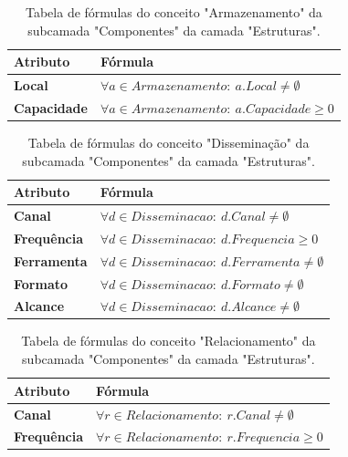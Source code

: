 \begin{apendicesenv}
\begin{table}[H]
\centering
\caption{Tabela de fórmulas do conceito "Armazenamento" da subcamada "Componentes" da camada "Estruturas".}
\begin{tabularx}{\textwidth}{|l|X|}
\hline
\textbf{Atributo} & \textbf{Fórmula} \\ \hline
\textbf{Local} & $\forall a \in Armazenamento:\ a.Local \neq \emptyset$ \\ \hline
\textbf{Capacidade} & $\forall a \in Armazenamento:\ a.Capacidade \ge 0$ \\ \hline
\end{tabularx}
\end{table}

\begin{table}[H]
\centering
\caption{Tabela de fórmulas do conceito "Disseminação" da subcamada "Componentes" da camada "Estruturas".}
\begin{tabularx}{\textwidth}{|l|X|}
\hline
\textbf{Atributo} & \textbf{Fórmula} \\ \hline
\textbf{Canal} & $\forall d \in Disseminacao:\ d.Canal \neq \emptyset$ \\ \hline
\textbf{Frequência} & $\forall d \in Disseminacao:\ d.Frequencia \ge 0$ \\ \hline
\textbf{Ferramenta} & $\forall d \in Disseminacao:\ d.Ferramenta \neq \emptyset$ \\ \hline
\textbf{Formato} & $\forall d \in Disseminacao:\ d.Formato \neq \emptyset$ \\ \hline
\textbf{Alcance} & $\forall d \in Disseminacao:\ d.Alcance \neq \emptyset$ \\ \hline
\end{tabularx}
\end{table}

\begin{table}[H]
\centering
\caption{Tabela de fórmulas do conceito "Relacionamento" da subcamada "Componentes" da camada "Estruturas".}
\begin{tabularx}{\textwidth}{|l|X|}
\hline
\textbf{Atributo} & \textbf{Fórmula} \\ \hline
\textbf{Canal} & $\forall r \in Relacionamento:\ r.Canal \neq \emptyset$ \\ \hline
\textbf{Frequência} & $\forall r \in Relacionamento:\ r.Frequencia \ge 0$ \\ \hline
\end{tabularx}
\end{table}


\end{apendicesenv}
